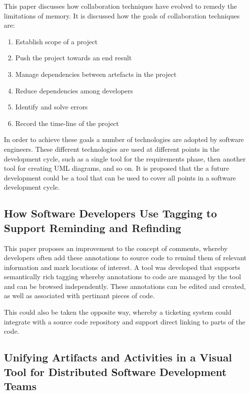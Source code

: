 \documentclass{l4proj}
\begin{document}
This paper discusses how collaboration techniques have evolved to remedy the limitations of memory. It is discussed how the goals of collaboration techniques are:

\begin {enumerate}
\item Establish scope of a project
\item Push the project towards an end result
\item Manage dependencies between artefacts in the project
\item Reduce dependencies among developers
\item Identify and solve errors
\item Record the time-line of the project
\end {enumerate}

In order to achieve these goals a number of technologies are adopted by software engineers.  These different technologies are used at different points in the development cycle, such as a single tool for the requirements phase, then another tool for creating UML diagrams, and so on.  It is proposed that the a future development could be a tool that can be used to cover all points in a software development cycle.

\subsection {How Software Developers Use Tagging to Support Reminding and Refinding}

This paper proposes an improvement to the concept of comments, whereby developers often add these annotations to source code to remind them of relevant information and mark locations of interest.  A tool was developed that supports semantically rich tagging whereby annotations to code are managed by the tool and can be browsed independently.  These annotations can be edited and created, as well as associated with pertinant pieces of code.  

This could also be taken the opposite way, whereby a ticketing system could integrate with a source code repository and support direct linking to parts of the code.

\subsection {Unifying Artifacts and Activities in a Visual Tool for Distributed Software Development Teams}
\end{document}
